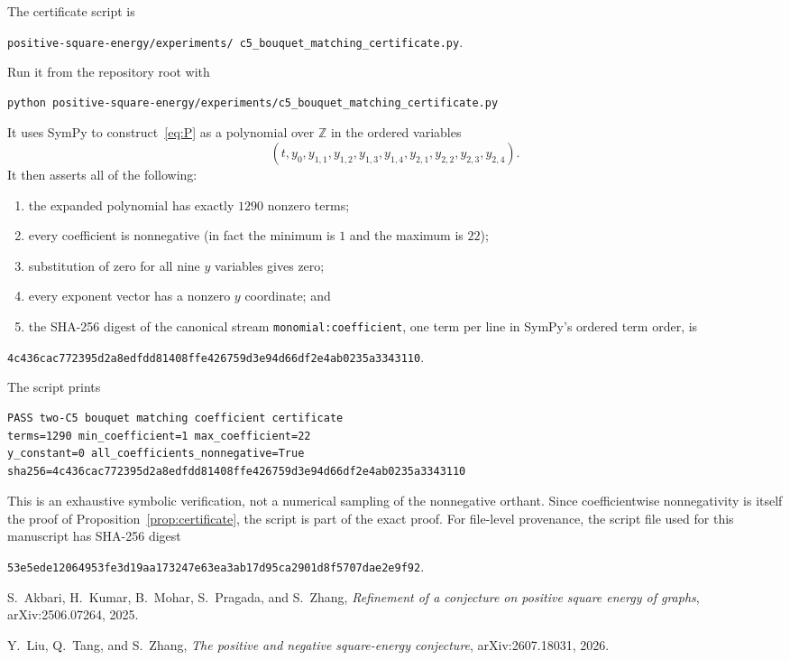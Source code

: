 \documentclass[11pt]{article}
\theoremstyle{remark}
\begin{document}
The certificate script is
\begin{center}
\texttt{positive-square-energy/experiments/\allowbreak
c5\_bouquet\_matching\_certificate.py}.
\end{center}
Run it from the repository root with
\begin{verbatim}
python positive-square-energy/experiments/c5_bouquet_matching_certificate.py
\end{verbatim}
It uses SymPy to construct~\eqref{eq:P} as a polynomial over $\mathbb Z$ in
the ordered variables
\[
 (t,y_0,y_{1,1},y_{1,2},y_{1,3},y_{1,4},
 y_{2,1},y_{2,2},y_{2,3},y_{2,4}).
\]
It then asserts all of the following:
\begin{enumerate}
\item the expanded polynomial has exactly $1290$ nonzero terms;
\item every coefficient is nonnegative (in fact the minimum is $1$ and the
      maximum is $22$);
\item substitution of zero for all nine $y$ variables gives zero;
\item every exponent vector has a nonzero $y$ coordinate; and
\item the SHA-256 digest of the canonical stream
      \texttt{monomial:coefficient}, one term per line in SymPy's ordered
      term order, is
\end{enumerate}
\begin{center}
\texttt{4c436cac772395d2a8edfdd81408ffe426759d3e94d66df2e4ab0235a3343110}.
\end{center}
The script prints
\begin{verbatim}
PASS two-C5 bouquet matching coefficient certificate
terms=1290 min_coefficient=1 max_coefficient=22
y_constant=0 all_coefficients_nonnegative=True
sha256=4c436cac772395d2a8edfdd81408ffe426759d3e94d66df2e4ab0235a3343110
\end{verbatim}
This is an exhaustive symbolic verification, not a numerical sampling of the
nonnegative orthant.  Since coefficientwise nonnegativity is itself the proof
of Proposition~\ref{prop:certificate}, the script is part of the exact proof.
For file-level provenance, the script file used for this manuscript has
SHA-256 digest
\begin{center}
\texttt{53e5ede12064953fe3d19aa173247e63ea3ab17d95ca2901d8f5707dae2e9f92}.
\end{center}

\begin{thebibliography}{9}

S.~Akbari, H.~Kumar, B.~Mohar, S.~Pragada, and S.~Zhang,
\emph{Refinement of a conjecture on positive square energy of graphs},
arXiv:2506.07264, 2025.

Y.~Liu, Q.~Tang, and S.~Zhang,
\emph{The positive and negative square-energy conjecture},
arXiv:2607.18031, 2026.

\end{thebibliography}
\end{document}
